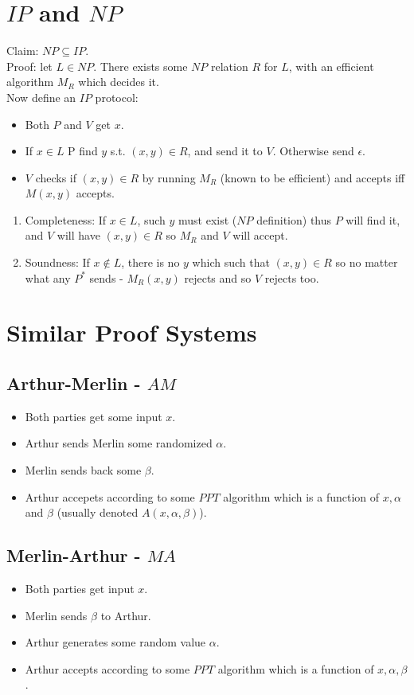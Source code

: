 \section{$IP$ and $NP$}
Claim:
$NP\subseteq IP$.\\
Proof: let $L\in NP$.
There exists some $NP$ relation $R$ for $L$, with an efficient algorithm $M_R$ which decides it.\\
Now define an $IP$ protocol:\\
\begin{itemize}
    \item Both $P$ and $V$ get $x$.
    \item If $x\in L$ P find $y$ s.t. $(x,y)\in R$, and send it to $V$. Otherwise send $\epsilon$.
    \item $V$ checks if $(x,y)\in R$ by running $M_R$ (known to be efficient) and accepts iff $M(x,y)$ accepts.
\end{itemize}
\begin{enumerate}
    \item Completeness: If $x\in L$, such $y$ must exist ($NP$ definition) thus $P$ will find it, and $V$ will have $(x,y)\in R$ so $M_R$ and $V$ will accept.
    \item Soundness: If $x\notin L$, there is no $y$ which such that $(x,y)\in R$ so no matter what any $P^*$ sends - $M_R(x,y)$ rejects and so $V$ rejects too.
 \end{enumerate}

\section{Similar Proof Systems}
\subsection{Arthur-Merlin - $AM$}
\begin{itemize}
    \item Both parties get some input $x$.
    \item Arthur sends Merlin some randomized $\alpha$.
    \item Merlin sends back some $\beta$.
    \item Arthur accepets according to some $PPT$ algorithm which is a function of $x,\alpha$ and $\beta$ (usually denoted $A(x,\alpha,\beta)$).
\end{itemize}

\subsection{Merlin-Arthur - $MA$}
\begin{itemize}
    \item Both parties get input $x$.
    \item Merlin sends $\beta$ to Arthur.
    \item Arthur generates some random value $\alpha$.
    \item Arthur accepts according to some $PPT$ algorithm which is a function of $x,\alpha,\beta$.
\end{itemize}


